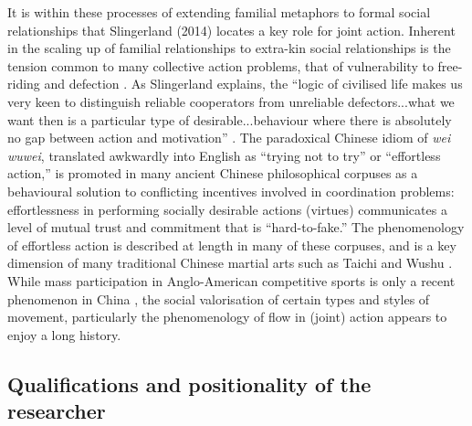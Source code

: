   It is within these processes of extending familial metaphors to formal social relationships that Slingerland (2014) locates a key role for joint action. Inherent in the scaling up of familial relationships to extra-kin social relationships is the tension common to many collective action problems, that of vulnerability to free-riding and defection \citep{Cosmides2013,Gavrilets2015}.
  As Slingerland explains, the ``logic of civilised life makes us very keen to distinguish reliable cooperators from unreliable defectors...what we want then is a particular type of desirable...behaviour where there is absolutely no gap between action and motivation'' \citep[192]{Slingerland2014}. The paradoxical Chinese idiom of \textit{wei wuwei}, translated awkwardly into English as ``trying not to try'' or ``effortless action,'' is promoted in many ancient Chinese philosophical corpuses as a behavioural solution to conflicting incentives involved in coordination problems: effortlessness in performing socially desirable actions (virtues) communicates a level of mutual trust and commitment that is ``hard-to-fake.''  The phenomenology of effortless action is described at length in many of these corpuses, and is a key dimension of many traditional Chinese martial arts such as Taichi and Wushu \citep{Morris1998}.
  While mass participation in Anglo-American competitive sports is only a recent phenomenon in China \citep{Brownell2008}, the social valorisation of certain types and styles of movement, particularly the phenomenology of flow in (joint) action appears to enjoy a long history.



  \subsection{Qualifications and positionality of the researcher}

